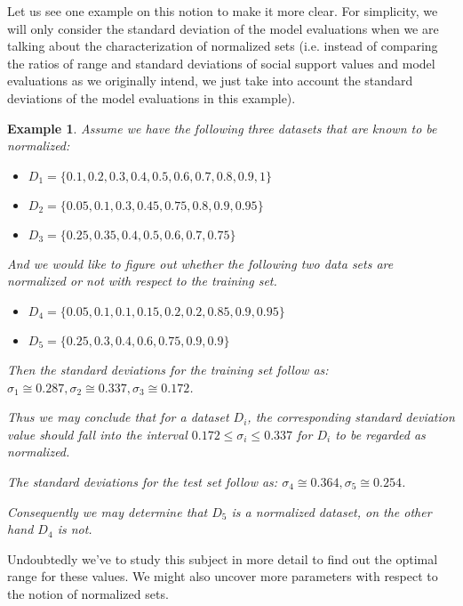 \documentclass{article}
\newtheorem{example}{Example}
\begin{document}
Let us see one example on this notion to make it more clear. For simplicity, we will only consider the standard deviation of the model evaluations when we are talking about the characterization of normalized sets (i.e. instead of comparing the ratios of range and standard deviations of social support values and model evaluations as we originally intend, we just take into account the standard deviations of the model evaluations in this example). 

\begin{example}
Assume we have the following three datasets that are known to be normalized:
\begin{itemize}
\item $D_1 = \{0.1, 0.2, 0.3, 0.4, 0.5, 0.6, 0.7, 0.8, 0.9, 1\}$
\item $D_2 = \{0.05, 0.1, 0.3, 0.45, 0.75, 0.8, 0.9, 0.95\}$
\item $D_3 = \{0.25, 0.35, 0.4, 0.5, 0.6, 0.7, 0.75\}$
\end{itemize}
And we would like to figure out whether the following two data sets are normalized or not with respect to the training set.
 \begin{itemize}
\item $D_4 = \{0.05, 0.1, 0.1, 0.15, 0.2, 0.2, 0.85, 0.9, 0.95\}$
\item $D_5 = \{0.25, 0.3, 0.4, 0.6, 0.75, 0.9, 0.9\}$
\end{itemize}

Then the standard deviations for the training set follow as: $\sigma_1\cong 0.287, \sigma_2\cong 0.337, \sigma_3\cong 0.172$. 

Thus we may conclude that for a dataset $D_i$, the corresponding standard deviation value should fall into the interval $0.172 \leq \sigma_i \leq 0.337$ for $D_i$ to be regarded as normalized.

The standard deviations for the test set follow as: $\sigma_4\cong 0.364, \sigma_5\cong 0.254$.

Consequently we may determine that $D_5$ is a normalized dataset, on the other hand $D_4$ is not.

\end{example}

Undoubtedly we've to study this subject in more detail to find out the optimal range for these values. We might also uncover more parameters with respect to the notion of normalized sets. 

\end{document}
